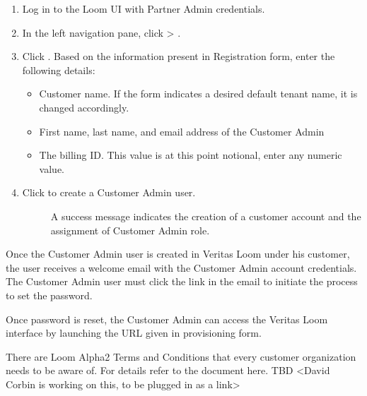 \documentclass[letterpaper,10pt,english]{sphinxmanual}
\begin{document}
\begin{enumerate}
\item {} 
Log in to the Loom UI with Partner Admin credentials.

\item {} 
In the left navigation pane, click  \textgreater{} .

\item {} 
Click .
Based on the information present in Registration form, enter the following details:
\begin{itemize}
\item {} 
Customer name. If the form indicates a desired default tenant name, it is changed accordingly.

\item {} 
First name, last name, and email address of the Customer Admin

\item {} 
The billing ID. This value is at this point notional, enter any numeric value.

\end{itemize}

\item {} \begin{description}
\item[{Click  to create a Customer Admin user.}] \leavevmode
A success message indicates the creation of a customer account and the assignment of Customer Admin role.

\end{description}

\end{enumerate}

Once the Customer Admin user is created in Veritas Loom under his customer, the user receives a welcome email with the Customer Admin account credentials. The Customer Admin user must click the link in the email to initiate the process to set the password.

Once password is reset, the Customer Admin can access the Veritas Loom interface by launching the URL given in provisioning form.

There are Loom Alpha2 Terms and Conditions that every customer organization needs to be aware of. For details refer to the document here. TBD \textless{}David Corbin is working on this, to be plugged in as a link\textgreater{}
\end{document}
